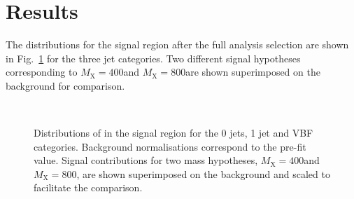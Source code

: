 \section{Results}\label{chap6:Results}

The \mti{} distributions for the signal region after the full analysis selection
are shown in Fig.~\ref{fig:13TeVmTishapes} for the three jet categories.
 Two different signal hypotheses corresponding to $M_\mathrm{X} = 400$\GeV and
 $M_\mathrm{X} = 800$\GeV are shown superimposed on the background for comparison.

\begin{figure}[htb]
\centering
{}
\\
\caption{
    Distributions of \mti{} in the signal region for the 0 jets, 1 jet and VBF categories. Background normalisations correspond to the pre-fit value. Signal contributions for two mass hypotheses, $M_\mathrm{X} = 400$\GeV and $M_\mathrm{X} = 800$\GeV, are shown superimposed on the background and scaled to facilitate the comparison.}
    \label{fig:13TeVmTishapes}
\end{figure}

